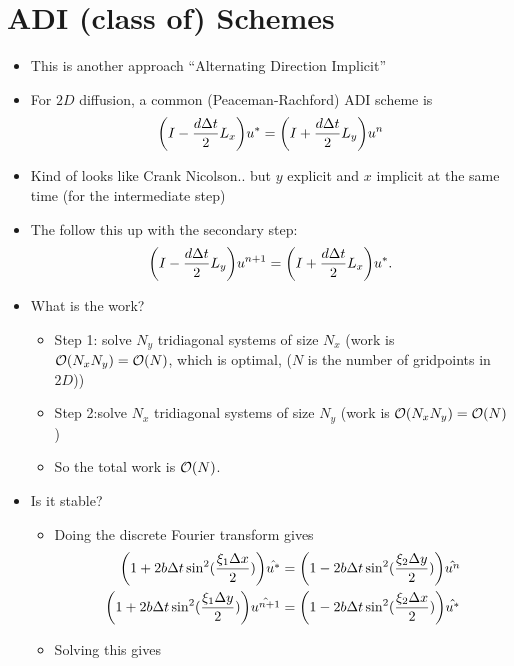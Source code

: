 \documentclass{article}
\newcommand{\Dx}{\Delta x}
\newcommand{\Dy}{\Delta y}
\newcommand{\Dt}{\Delta t}
\begin{document}
    \section{ADI (class of) Schemes}
        \begin{itemize}
            \item This is another approach ``Alternating Direction Implicit''
            \item For $2D$ diffusion, a common (Peaceman-Rachford) ADI scheme is
            \begin{align*}
                \qty(I - \frac{d\Dt}{2}L_x)u^* = \qty(I + \frac{d\Dt}{2}L_y)u^n
            \end{align*}
            \item Kind of looks like Crank Nicolson.. but $y$ explicit and $x$ implicit at the same time (for the intermediate step)
            \item The follow this up with the secondary step:
            \begin{align*}
                \qty(I - \frac{d\Dt}{2}L_y)u^{n+1} = \qty(I + \frac{d\Dt}{2}L_x)u^*.
            \end{align*}
            \item What is the work?
            \begin{itemize}
                \item Step 1: solve $N_y$ tridiagonal systems of size $N_x$ (work is $\order{N_xN_y} = \order{N}$, which is optimal, ($N$ is the number of gridpoints in $2D$))
                \item Step 2:solve $N_x$ tridiagonal systems of size $N_y$ (work is $\order{N_xN_y} = \order{N}$)
                \item So the total work is $\order{N}$.
            \end{itemize}
            \item Is it stable?
            \begin{itemize}
                \item Doing the discrete Fourier transform gives
                \begin{align*}
                    \qty(1 + 2b\Dt\sin^2(\frac{\xi_1\Dx}{2}))\hat{u^*} &= \qty(1 - 2b\Dt\sin^2(\frac{\xi_2\Dy}{2}))\hat{u^n} \\
                    \qty(1 + 2b\Dt\sin^2(\frac{\xi_1\Dy}{2}))\hat{u^{n+1}} &= \qty(1 - 2b\Dt\sin^2(\frac{\xi_2\Dx}{2}))\hat{u^*}
                \end{align*}
                \item Solving this gives

\end{itemize}
\end{itemize}
\end{document}
